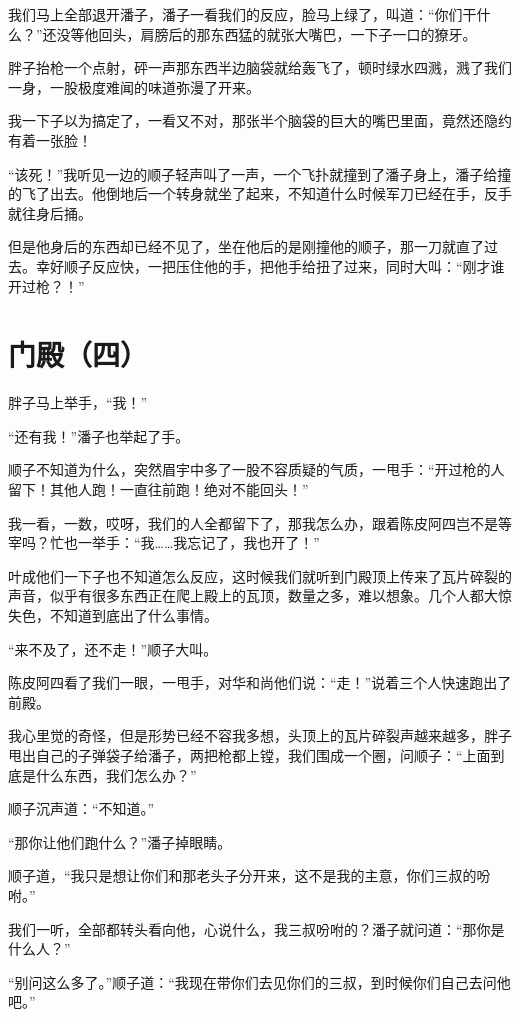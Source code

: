 我们马上全部退开潘子，潘子一看我们的反应，脸马上绿了，叫道：“你们干什么？”还没等他回头，肩膀后的那东西猛的就张大嘴巴，一下子一口的獠牙。

胖子抬枪一个点射，砰一声那东西半边脑袋就给轰飞了，顿时绿水四溅，溅了我们一身，一股极度难闻的味道弥漫了开来。

我一下子以为搞定了，一看又不对，那张半个脑袋的巨大的嘴巴里面，竟然还隐约有着一张脸！

“该死！”我听见一边的顺子轻声叫了一声，一个飞扑就撞到了潘子身上，潘子给撞的飞了出去。他倒地后一个转身就坐了起来，不知道什么时候军刀已经在手，反手就往身后捅。

但是他身后的东西却已经不见了，坐在他后的是刚撞他的顺子，那一刀就直了过去。幸好顺子反应快，一把压住他的手，把他手给扭了过来，同时大叫：“刚才谁开过枪？！”

\chapter{门殿（四）}

胖子马上举手，“我！”

“还有我！”潘子也举起了手。

顺子不知道为什么，突然眉宇中多了一股不容质疑的气质，一甩手：“开过枪的人留下！其他人跑！一直往前跑！绝对不能回头！”

我一看，一数，哎呀，我们的人全都留下了，那我怎么办，跟着陈皮阿四岂不是等宰吗？忙也一举手：“我……我忘记了，我也开了！”

叶成他们一下子也不知道怎么反应，这时候我们就听到门殿顶上传来了瓦片碎裂的声音，似乎有很多东西正在爬上殿上的瓦顶，数量之多，难以想象。几个人都大惊失色，不知道到底出了什么事情。

“来不及了，还不走！”顺子大叫。

陈皮阿四看了我们一眼，一甩手，对华和尚他们说：“走！”说着三个人快速跑出了前殿。

我心里觉的奇怪，但是形势已经不容我多想，头顶上的瓦片碎裂声越来越多，胖子甩出自己的子弹袋子给潘子，两把枪都上镗，我们围成一个圈，问顺子：“上面到底是什么东西，我们怎么办？”

顺子沉声道：“不知道。”

“那你让他们跑什么？”潘子掉眼睛。

顺子道，“我只是想让你们和那老头子分开来，这不是我的主意，你们三叔的吩咐。”

我们一听，全部都转头看向他，心说什么，我三叔吩咐的？潘子就问道：“那你是什么人？”

“别问这么多了。”顺子道：“我现在带你们去见你们的三叔，到时候你们自己去问他吧。”

